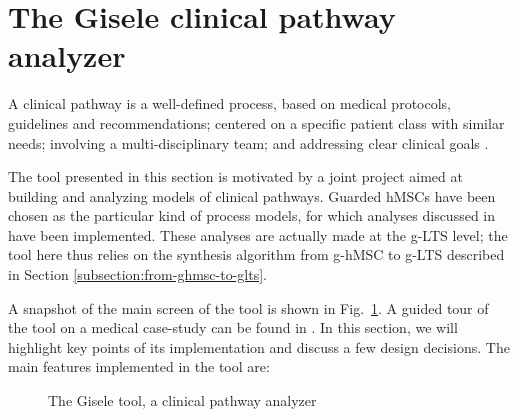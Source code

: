 \section{The Gisele clinical pathway analyzer\label{section:tool-clinical-pathway-analyzer}}

A clinical pathway is a well-defined process, based on medical protocols, guidelines and recommendations; centered on a specific patient class with similar needs; involving a multi-disciplinary team; and addressing clear clinical goals \cite{Middleton:2000}. 

The tool presented in this section is motivated by a joint project aimed at building and analyzing models of clinical pathways. Guarded hMSCs have been chosen as the particular kind of process models, for which analyses discussed in \cite{Damas:2011} have been implemented. These analyses are actually made at the g-LTS level; the tool here thus relies on the synthesis algorithm from g-hMSC to g-LTS described in Section \ref{subsection:from-ghmsc-to-glts}.

A snapshot of the main screen of the tool is shown in Fig.~\ref{image:gisele-tool}. A guided tour of the tool on a medical case-study can be found in \cite{Damas:2011}. In this section, we will highlight key points of its implementation and discuss a few design decisions. The main features implemented in the tool are:

\begin{figure}
\centering{}
  \caption{The Gisele tool, a clinical pathway analyzer\label{image:gisele-tool}}
\end{figure}

